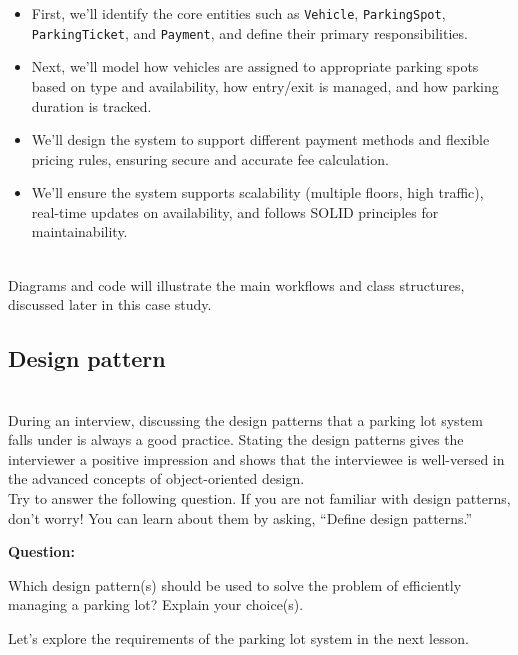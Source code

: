 \begin{itemize}
\item
\protect{}\label{XPEjY3rHekZwU69nb4nlI}
First, we'll identify the core entities such as \texttt{Vehicle}, \texttt{ParkingSpot}, \texttt{ParkingTicket}, and \texttt{Payment}, and define their primary responsibilities.
\item
\protect{}\label{1CD8z7GqPZIQ-ymn3WuAp}
Next, we'll model how vehicles are assigned to appropriate parking spots based on type and availability, how entry/exit is managed, and how parking duration is tracked.
\item
\protect{}\label{VMxYKEIAhyqCjDKBov965}
We'll design the system to support different payment methods and flexible pricing rules, ensuring secure and accurate fee calculation.
\item
\protect{}\label{7yQxCM1nFOwfF2SaJRR7a}
We'll ensure the system supports scalability (multiple floors, high traffic), real-time updates on availability, and follows SOLID principles for maintainability.
\end{itemize}
\\
Diagrams and code will illustrate the main workflows and class structures, discussed later in this case study.

\subsection{Design pattern~}\label{pCaGYU8B78ti-aCh2WyPC}
\\
During an interview, discussing the design patterns that a parking lot system falls under is always a good practice. Stating the design patterns gives the interviewer a positive impression and shows that the interviewee is well-versed in the advanced concepts of object-oriented design.
\\
Try to answer the following question. If you are not familiar with design patterns, don't worry! You can learn about them by asking, ``Define design patterns.''

\textbf{Question:}

Which design pattern(s) should be used to solve the problem of efficiently managing a parking lot? Explain your choice(s).

Let's explore the requirements of the parking lot system in the next lesson.

